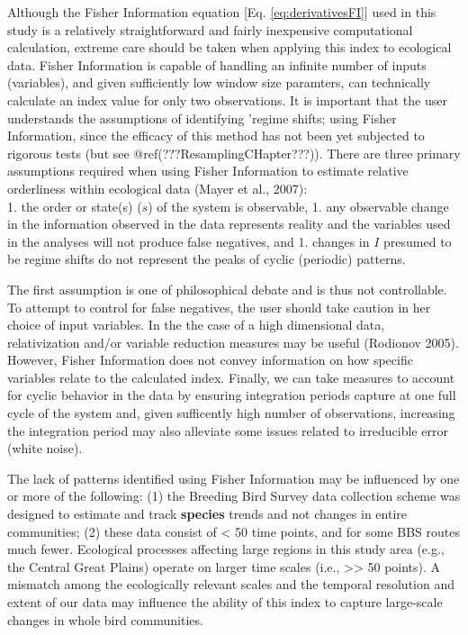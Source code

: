 \documentclass[12pt,twoside,openany]{reedthesis}
\begin{document}
Although the Fisher Information equation {[}Eq. \eqref{eq:derivativesFI}{]} used in this study is a relatively straightforward and fairly inexpensive computational calculation, extreme care should be taken when applying this index to ecological data. Fisher Information is capable of handling an infinite number of inputs (variables), and given sufficiently low window size paramters, can technically calculate an index value for only two observations. It is important that the user understands the assumptions of identifying 'regime shifts; using Fisher Information, since the efficacy of this method has not been yet subjected to rigorous tests (but see @ref(???ResamplingCHapter???)). There are three primary assumptions required when using Fisher Information to estimate relative orderliness within ecological data (Mayer et al., 2007):\\
1. the order or state(s) (\(s\)) of the system is observable,
1. any observable change in the information observed in the data represents reality and the variables used in the analyses will not produce false negatives, and
1. changes in \(I\) presumed to be regime shifts do not represent the peaks of cyclic (periodic) patterns.

The first assumption is one of philosophical debate and is thus not controllable. To attempt to control for false negatives, the user should take caution in her choice of input variables. In the the case of a high dimensional data, relativization and/or variable reduction measures may be useful (Rodionov 2005). However, Fisher Information does not convey information on how specific variables relate to the calculated index. Finally, we can take measures to account for cyclic behavior in the data by ensuring integration periods capture at one full cycle of the system and, given sufficently high number of observations, increasing the integration period may also alleviate some issues related to irreducible error (white noise).

The lack of patterns identified using Fisher Information may be influenced by one or more of the following: (1) the Breeding Bird Survey data collection scheme was designed to estimate and track \textbf{species} trends and not changes in entire communities; (2) these data consist of \textless{} 50 time points, and for some BBS routes much fewer. Ecological processes affecting large regions in this study area (e.g., the Central Great Plains) operate on larger time scales (i.e., \textgreater{}\textgreater{} 50 points). A mismatch among the ecologically relevant scales and the temporal resolution and extent of our data may influence the ability of this index to capture large-scale changes in whole bird communities.
\end{document}
